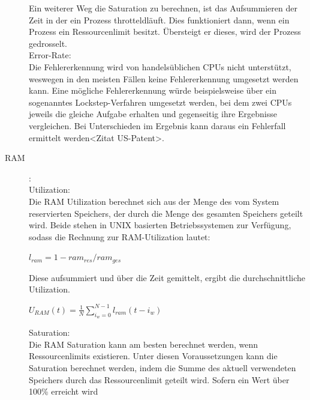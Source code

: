 \documentclass[a4paper,10pt]{scrartcl}
\begin{document}
\begin{description}
\begin{minipage}{\linewidth}
\end{minipage}

Ein weiterer Weg die Saturation zu berechnen, ist das Aufsummieren der Zeit in der ein Prozess \glqq throtteld\grqq läuft. Dies funktioniert dann, wenn ein Prozess ein Ressourcenlimit besitzt. Übersteigt er dieses, wird der Prozess gedrosselt.\\
Error-Rate:\\
Die Fehlererkennung wird von handelsüblichen CPUs nicht unterstützt, weswegen in den meisten Fällen keine Fehlererkennung umgesetzt werden kann. Eine mögliche Fehlererkennung würde beispielsweise über ein sogenanntes Lockstep-Verfahren umgesetzt werden, bei dem zwei CPUs jeweils die gleiche Aufgabe erhalten und gegenseitig ihre Ergebnisse vergleichen. Bei Unterschieden im Ergebnis kann daraus ein Fehlerfall ermittelt werden\cite{.}<Zitat US-Patent>.
\item[RAM]:\\
Utilization:\\
Die RAM Utilization berechnet sich aus der Menge des vom System reservierten Speichers, der durch die Menge des gesamten Speichers geteilt wird. Beide stehen in UNIX basierten Betriebssystemen zur Verfügung, sodass die Rechnung zur RAM-Utilization lautet:\\

\begin{minipage}{\linewidth}
\(
\displaystyle{l_{ram}=1-ram_{res}/ram_{ges}}
\) 

\end{minipage}

Diese aufsummiert und über die Zeit gemittelt, ergibt die durchschnittliche Utilization.\\

\begin{minipage}{\linewidth}
\(
\displaystyle{U_{RAM}(t)=\frac{1}{N}{\sum\limits_{i_{w}=0}^{N-1} l_{ram}{(t-i_{w})}} }
\) 
\\
\end{minipage}

\pagebreak

Saturation:\\
Die RAM Saturation kann am besten berechnet werden, wenn Ressourcenlimits existieren. Unter diesen Voraussetzungen kann die Saturation berechnet werden, indem die Summe des aktuell verwendeten Speichers durch das Ressourcenlimit geteilt wird. Sofern ein Wert über 100\% erreicht wird\\


\end{description}
\end{document}
